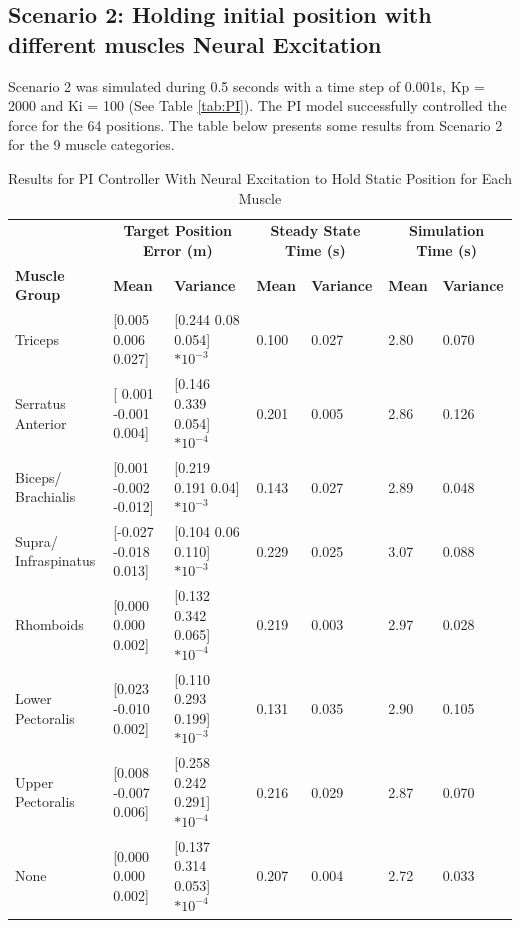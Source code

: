 \subsection{Scenario 2: Holding initial position with different muscles Neural Excitation}
Scenario 2 was simulated during 0.5 seconds with a time step of 0.001s, Kp = 2000 and Ki = 100 (See Table \ref{tab:PI}).
The PI model successfully controlled the force for the 64 positions. The table below presents some results from Scenario 2 for the 9 muscle categories.
\begin{table}[h]
    \centering
    \tiny %
    \caption{Results for PI Controller With Neural Excitation to Hold Static Position for Each Muscle}
    \begin{tabularx}{\linewidth}{|l|X|X|X|X|X|X|}
        \hline
        & \multicolumn{2}{c|}{\textbf{Target Position Error (m)}} & \multicolumn{2}{c|}{\textbf{Steady State Time (s)}} & \multicolumn{2}{c|}{\textbf{Simulation Time (s)}} \\
        \cline{2-7}
        \textbf{Muscle Group} & \textbf{Mean} & \textbf{Variance} & \textbf{Mean} & \textbf{Variance} & \textbf{Mean} & \textbf{Variance} \\
        \hline
        Triceps & [0.005 0.006 0.027] & [0.244 0.08 0.054]$*10^{-3}$ &  0.100 & 0.027 & 2.80 & 0.070 \\
        \hline
        Serratus Anterior & [ 0.001 -0.001 0.004] & [0.146 0.339 0.054]$*10^{-4}$ &  0.201 & 0.005 & 2.86 & 0.126 \\
        \hline
        Biceps/ Brachialis & [0.001 -0.002 -0.012] & [0.219 0.191 0.04]$*10^{-3}$ &  0.143 & 0.027 & 2.89 & 0.048 \\
        \hline
        Supra/ Infraspinatus & [-0.027 -0.018 0.013] & [0.104 0.06 0.110]$*10^{-3}$ & 0.229 & 0.025  & 3.07 & 0.088 \\
        \hline
        Rhomboids & [0.000 0.000 0.002] & [0.132 0.342 0.065]$*10^{-4}$ &   0.219 & 0.003 & 2.97 & 0.028 \\
        \hline
        Lower Pectoralis & [0.023 -0.010 0.002] & [0.110 0.293 0.199]$*10^{-3}$ &  0.131 & 0.035 & 2.90 & 0.105 \\
        \hline
        Upper Pectoralis & [0.008 -0.007 0.006] & [0.258 0.242 0.291]$*10^{-4}$ &   0.216 & 0.029 & 2.87 & 0.070 \\
        \hline
        None & [0.000 0.000 0.002] & [0.137 0.314 0.053]$*10^{-4}$ &  0.207 & 0.004 & 2.72 & 0.033 \\
        \hline
    \end{tabularx}
    \label{table:PIResults}
\end{table}

